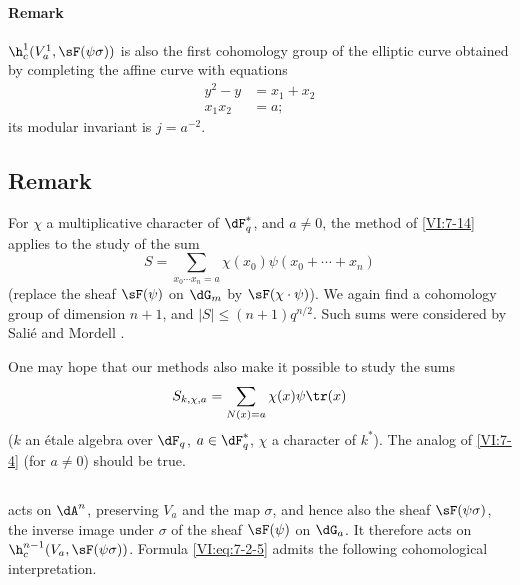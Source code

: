 \paragraph{Remark}

$\h_c^1(V_a^1,\sF(\psi\sigma))$ is also the first cohomology group of 
the elliptic curve obtained by completing the affine curve with equations 
\begin{align*}
  y^2-y &= x_1+x_2 \\
  x_1 x_2 &= a \text{;} 
\end{align*}
its modular invariant is $j=a^{-2}$. 






\subsection{Remark}\label{VI:7-18}

For $\chi$ a multiplicative character of $\dF_q^\ast$, and $a\ne 0$, the 
method of \ref{VI:7-14} applies to the study of the sum 
\[
  S = \sum_{x_0\dotsm x_n = a} \chi(x_0) \psi(x_0+\cdots + x_n) 
\]
(replace the sheaf $\sF(\psi)$ on $\dG_m$ by $\sF(\chi\cdot \psi)$). We 
again find a cohomology group of dimension $n+1$, and 
$|S|\leqslant (n+1)q^{n/2}$. Such sums were considered by 
Salié and Mordell .

One may hope that our methods also make it possible to study the sums 
\[
  S_{k,\chi,a} = \sum_{N(x)=a} \chi(x) \psi \tr(x) 
\]
($k$ an étale algebra over $\dF_q$, $a\in \dF_q^\ast$, $\chi$ a character of 
$k^\ast$). The analog of \ref{VI:7-4} (for $a\ne 0$) should be true. 





\subsection{}\label{VI:7-19}

 acts on $\dA^n$, preserving $V_a$ and 
the map $\sigma$, and hence also the sheaf $\sF(\psi\sigma)$, the inverse 
image under $\sigma$ of the sheaf $\sF(\psi)$ on $\dG_a$. It therefore acts 
on $\h_c^{n-1}(V_a,\sF(\psi\sigma))$. Formula \eqref{VI:eq:7-2-5} admits 
the following cohomological interpretation.





